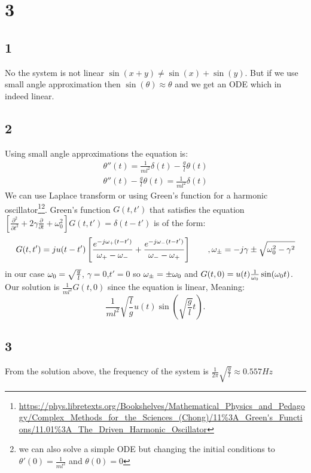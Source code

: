 \section{3}
\subsection{1}
No the system is not linear $\sin(x+y)\neq \sin(x)+\sin(y)$.
But if we use small angle approximation then $\sin(\theta)\approx \theta$ and we get an ODE which in indeed linear.
\subsection{2}
Using small angle approximations the equation is:
\begin{align}
    \theta''(t)=\frac{1}{m l^2}\delta(t)-\frac{g}{l}\theta(t)\\
    \theta''(t)-\frac{g}{l}\theta(t)=\frac{1}{m l^2}\delta(t)
\end{align}
We can use Laplace transform or using Green's function for a harmonic oscillator\footnote{\url{https://phys.libretexts.org/Bookshelves/Mathematical_Physics_and_Pedagogy/Complex_Methods_for_the_Sciences_(Chong)/11\%3A_Green's_Functions/11.01\%3A_The_Driven_Harmonic_Oscillator}}\footnote{we can also solve a simple ODE but changing the initial conditions to $\theta'(0)=\frac{1}{m l^2}$ and $\theta(0)=0$}.
Green's function $G(t,t')$ that satisfies the equation $\left[\frac{\partial^2}{\partial t^2}+2\gamma\frac{\partial}{\partial t}+\omega_0^2\right]G(t,t')=\delta(t-t')$ is of the form:
\begin{equation}
    G(t,t')=j u(t-t')
    \left[
        \frac{e^{-j \omega_+(t-t')}}{\omega_+-\omega_-}+
        \frac{e^{-j \omega_-(t-t')}}{\omega_--\omega_+}
    \right]
    \quad\quad, \omega_\pm = -j\gamma \pm \sqrt{\omega_0^2-\gamma^2}
\end{equation}
in our case $\omega_0=\sqrt{\frac{g}{l}}$, $\gamma=0$,$t'=0$ so $\omega_\pm=\pm\omega_0$ and $G(t,0)=u(t)\frac{1}{\omega_0}\sin(\omega_0t)$. Our solution is $\frac{1}{m l^2}G(t,0)$ since the equation is linear, Meaning:
\begin{equation}
    \frac{1}{m l^2}\sqrt{\frac{l}{g}}u(t)\sin(\sqrt{\frac{g}{l}}t).
\end{equation}
\subsection{3}
From the solution above, the frequency of the system is $\frac{1}{2\pi}\sqrt{\frac{g}{l}}\approx 0.557 Hz$
